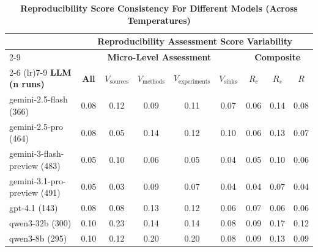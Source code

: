 \documentclass{article}
\begin{document}
\begin{table}[!ht]
\centering
\caption{\textbf{Reproducibility Score Consistency For Different Models (Across Temperatures)}}
\label{tab:repro-score-consistency-avg-temperature}
\begin{tabular}{lcccccccc}
\toprule
& \multicolumn{8}{c}{\textbf{Reproducibility Assessment Score Variability}} \\
\cmidrule(lr){2-9}
& \multicolumn{5}{c}{\textbf{Micro-Level Assessment}} 
& \multicolumn{3}{c}{\textbf{Composite}} \\
\cmidrule(lr){2-6} \cmidrule(lr){7-9}
\textbf{LLM (n runs)} 
& \textbf{All} 
& {$V_{\text{sources}}$} 
& {$V_{\text{methods}}$} 
& {$V_{\text{experiments}}$} 
& {$V_{\text{sinks}}$} 
& {$R_c$} 
& {$R_s$} 
& {$R$} \\
\midrule
gemini-2.5-flash (366)       & 0.08 & 0.12 & 0.09 & 0.11 & 0.07 & 0.06 & 0.14 & 0.08 \\
gemini-2.5-pro (464)         & 0.08 & 0.05 & 0.14 & 0.12 & 0.10 & 0.06 & 0.13 & 0.07 \\
gemini-3-flash-preview (483) & 0.05 & 0.10 & 0.06 & 0.05 & 0.04 & 0.05 & 0.10 & 0.06 \\
gemini-3.1-pro-preview (491) & 0.05 & 0.03 & 0.09 & 0.07 & 0.04 & 0.04 & 0.07 & 0.04 \\
gpt-4.1 (143)                & 0.08 & 0.08 & 0.13 & 0.12 & 0.06 & 0.07 & 0.06 & 0.06 \\
qwen3-32b (300)              & 0.10 & 0.23 & 0.14 & 0.14 & 0.08 & 0.09 & 0.17 & 0.12 \\
qwen3-8b (295)               & 0.10 & 0.12 & 0.20 & 0.20 & 0.08 & 0.09 & 0.13 & 0.09 \\
\bottomrule
\end{tabular}
\end{table}





\end{document}
